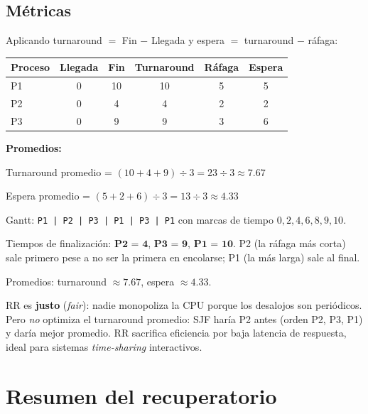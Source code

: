 \documentclass[11pt,a4paper]{article}
\begin{document}
\subsection*{Métricas}

Aplicando turnaround $=$ Fin $-$ Llegada y espera $=$ turnaround $-$
ráfaga:

\begin{center}
\small
\begin{tabular}{@{}lccccc@{}}
\toprule
Proceso & Llegada & Fin & Turnaround & Ráfaga & Espera \\
\midrule
P1 & 0 & 10 & 10 & 5 & 5 \\
P2 & 0 & 4  & 4  & 2 & 2 \\
P3 & 0 & 9  & 9  & 3 & 6 \\
\bottomrule
\end{tabular}
\end{center}

\textbf{Promedios:}

\quad Turnaround promedio = $(10 + 4 + 9) \div 3 = 23 \div 3 ≈ 7.67$

\quad Espera promedio = $(5 + 2 + 6) \div 3 = 13 \div 3 ≈ 4.33$

\begin{respuesta}
Gantt: \texttt{P1 | P2 | P3 | P1 | P3 | P1} con marcas de tiempo
$0, 2, 4, 6, 8, 9, 10$.

Tiempos de finalización: $\textbf{P2 = 4}$, $\textbf{P3 = 9}$,
$\textbf{P1 = 10}$. P2 (la ráfaga más corta) sale primero pese a no
ser la primera en encolarse; P1 (la más larga) sale al final.

Promedios: turnaround $≈ 7.67$, espera $≈ 4.33$.
\end{respuesta}

\begin{idea}
RR es \textbf{justo} (\emph{fair}): nadie monopoliza la CPU porque
los desalojos son periódicos. Pero \emph{no} optimiza el turnaround
promedio: SJF haría P2 antes (orden P2, P3, P1) y daría mejor
promedio. RR sacrifica eficiencia por baja latencia de respuesta,
ideal para sistemas \emph{time-sharing} interactivos.
\end{idea}

\section*{Resumen del recuperatorio}
\end{document}
